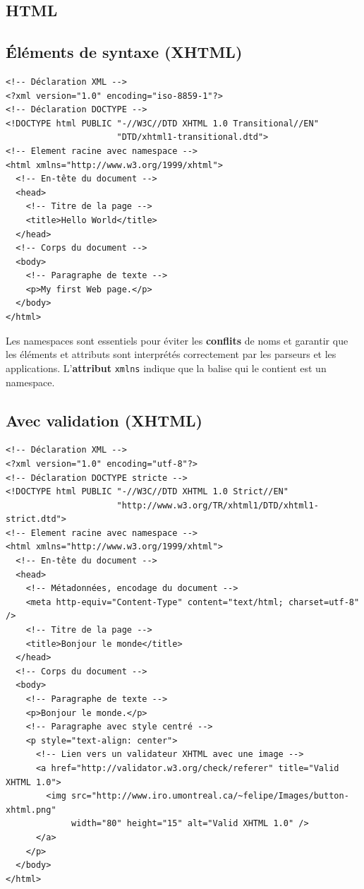 \documentclass{report}
\begin{document}
\begin{multicols*}{2}
\chapter{HTML}

\section{Éléments de syntaxe (XHTML)}
\begin{lstlisting}[style=HTMLDraculaDark]
<!-- Déclaration XML -->
<?xml version="1.0" encoding="iso-8859-1"?>
<!-- Déclaration DOCTYPE -->
<!DOCTYPE html PUBLIC "-//W3C//DTD XHTML 1.0 Transitional//EN"
                      "DTD/xhtml1-transitional.dtd">
<!-- Element racine avec namespace -->
<html xmlns="http://www.w3.org/1999/xhtml">
  <!-- En-tête du document -->
  <head>
    <!-- Titre de la page -->
    <title>Hello World</title>
  </head>
  <!-- Corps du document -->
  <body>
    <!-- Paragraphe de texte -->
    <p>My first Web page.</p>
  </body>
</html>
\end{lstlisting}

\begin{note}{}{}
Les namespaces sont essentiels pour éviter les \textbf{conflits}  de noms et garantir que 
les éléments et attributs sont interprétés correctement par les parseurs et les applications.   
L'\textbf{attribut} \texttt{\textcolor{htmltag}{xmlns}} indique que la balise qui le contient est un namespace.     
\end{note}

\section{Avec validation (XHTML)}

\begin{lstlisting}[style=HTMLDraculaDark]
<!-- Déclaration XML -->
<?xml version="1.0" encoding="utf-8"?>
<!-- Déclaration DOCTYPE stricte -->
<!DOCTYPE html PUBLIC "-//W3C//DTD XHTML 1.0 Strict//EN"
                      "http://www.w3.org/TR/xhtml1/DTD/xhtml1-strict.dtd">
<!-- Element racine avec namespace -->
<html xmlns="http://www.w3.org/1999/xhtml">
  <!-- En-tête du document -->
  <head>
    <!-- Métadonnées, encodage du document -->
    <meta http-equiv="Content-Type" content="text/html; charset=utf-8" />
    <!-- Titre de la page -->
    <title>Bonjour le monde</title>
  </head>
  <!-- Corps du document -->
  <body>
    <!-- Paragraphe de texte -->
    <p>Bonjour le monde.</p>
    <!-- Paragraphe avec style centré -->
    <p style="text-align: center">
      <!-- Lien vers un validateur XHTML avec une image -->
      <a href="http://validator.w3.org/check/referer" title="Valid XHTML 1.0">
        <img src="http://www.iro.umontreal.ca/~felipe/Images/button-xhtml.png"
             width="80" height="15" alt="Valid XHTML 1.0" />
      </a>
    </p>
  </body>
</html>
\end{lstlisting}


\end{multicols*}
\end{document}
